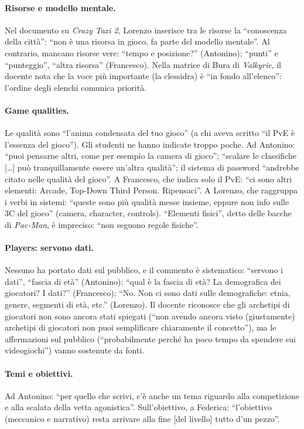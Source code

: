 \paragraph{Risorse e modello mentale.} Nel documento su \emph{Crazy Taxi 2},
Lorenzo inserisce tra le risorse la ``conoscenza della città'': ``non è una
risorsa in gioco, fa parte del modello mentale''. Al contrario, mancano
risorse vere: ``tempo e posizione?'' (Antonino); ``punti'' e ``punteggio'',
``altra risorsa'' (Francesco). Nella matrice di Bura di \emph{Valkyrie}, il
docente nota che la voce più importante (la clessidra) è ``in fondo
all'elenco'': l'ordine degli elenchi comunica priorità.

\paragraph{Game qualities.} Le qualità sono ``l'anima condensata del tuo
gioco'' (a chi aveva scritto ``il PvE è l'essenza del gioco''). Gli studenti
ne hanno indicate troppo poche. Ad Antonino: ``puoi pensarne altri, come per
esempio la camera di gioco''; ``scalare le classifiche [\dots] può
tranquillamente essere un'altra qualità''; il sistema di password ``andrebbe
citato nelle qualità del gioco''. A Francesco, che indica solo il PvE: ``ci
sono altri elementi: Arcade, Top-Down Third Person. Ripensaci''. A Lorenzo,
che raggruppa i verbi in sistemi: ``queste sono più qualità messe insieme,
eppure non info sulle 3C del gioco'' (camera, character, controls).
``Elementi fisici'', detto delle bacche di \emph{Pac-Man}, è impreciso: ``non
seguono regole fisiche''.

\paragraph{Players: servono dati.} Nessuno ha portato dati sul pubblico, e il
commento è sistematico: ``servono i dati'', ``fascia di età'' (Antonino);
``qual è la fascia di età? La demografica dei giocatori? I dati?''
(Francesco); ``No. Non ci sono dati sulle demografiche: etnia, genere,
segmenti di età, etc.'' (Lorenzo). Il docente riconosce che gli archetipi di
giocatori non sono ancora stati spiegati (``non avendo ancora visto
(giustamente) archetipi di giocatori non puoi semplificare chiaramente il
concetto''), ma le affermazioni sul pubblico (``probabilmente perché ha poco
tempo da spendere sui videogiochi'') vanno sostenute da fonti.

\paragraph{Temi e obiettivi.} Ad Antonino: ``per quello che scrivi, c'è anche
un tema riguardo alla competizione e alla scalata della vetta agonistica''.
Sull'obiettivo, a Federica: ``l'obiettivo (meccanico e narrativo) resta
arrivare alla fine [del livello] tutto d'un pezzo''.

